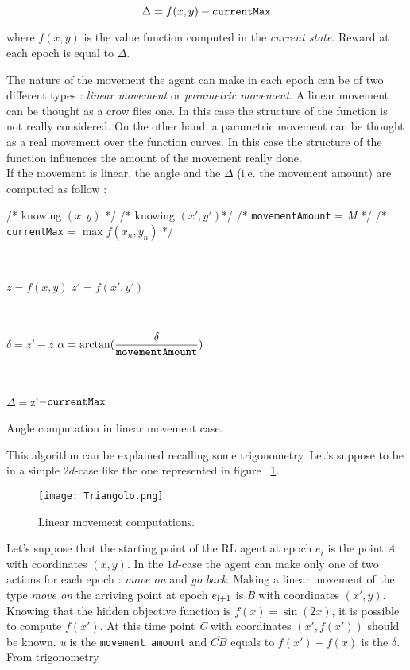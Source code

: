 \begin{itemize}
	\begin{equation}
		\Delta = f(x, y) - {\tt currentMax}
	\end{equation} 
	
	where $f(x, y)$ is the value function computed in the  \textit{current state}. Reward at each epoch is equal to $\Delta$.
	
\end{itemize}

The nature of the movement the agent can make in each epoch can be of two different types : \textit{linear movement} or \textit{parametric movement}. A linear movement can be thought as a crow flies one. In this case the structure of the function is not really considered. On the other hand, a parametric movement can be thought as a real movement over the function curves. In this case the structure of the function influences the amount of the movement really done. \\

If the movement is linear, the angle and the $\Delta$ (i.e. the movement amount) are computed as follow :

\begin{algorithm}
	/* knowing $(x, y)$ */ \;
	/* knowing $(x', y')$*/ \;
	/* {\tt movementAmount} = \textit{M} */ \;
	/* {\tt currentMax} = $\max f(x_n, y_n)$ */ \;
	
	
	\
	
	$z = f(x, y)$ \;
	$z' = f(x', y')$\;
	
	\
	
	$\delta = z' - z$ \;
	$\alpha = \arctan(\dfrac{\delta}{\tt movementAmount})$
	 
	 \
	 
	 $\Delta = $z'$ - {\tt currentMax} $
	 
	 \caption{Angle computation in linear movement case.} 
	
\end{algorithm}

This algorithm can be explained recalling some trigonometry. Let's suppose to be in a simple $2d$-case like the one represented in figure ~\ref{fig:LMComputations}.

\begin{figure} [h!]
	\centering
	\texttt{[image: Triangolo.png]}
	\caption{Linear movement computations.}
	\label{fig:LMComputations}
\end{figure}

Let's suppose that the starting point of the RL agent at epoch $e_i$ is the point \textit{A} with coordinates $(x, y)$. In the $1d$-case the agent can make only one of two actions for each epoch : \textit{move on} and \textit{go back}. Making a linear movement of the type \textit{move on} the arriving point at epoch $e\textsubscript{i+1}$ is \textit{B} with coordinates $(x', y)$. Knowing that the hidden objective function is $f(x) = \sin(2x)$, it is possible to compute $f(x')$. At this time point \textit{C} with coordinates $(x', f(x'))$ should be known. \textit{u} is the {\tt movement amount} and $\overline{CB}$ equals to $f(x') - f(x)$ is the $\delta$. From trigonometry 

